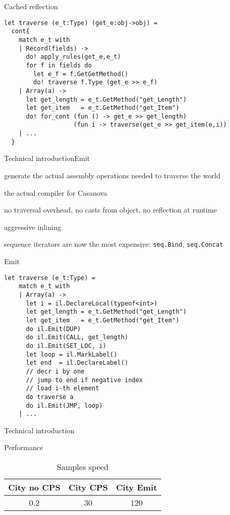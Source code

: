 \documentclass{beamer}
\begin{document}
\begin{frame}[fragile]{Cached reflection}
\begin{lstlisting}
let traverse (e_t:Type) (get_e:obj->obj) =
  cont{
    match e_t with
    | Record(fields) ->
      do! apply_rules(get_e,e_t)
      for f in fields do
        let e_f = f.GetGetMethod()
        do! traverse f.Type (get_e >> e_f)
    | Array(a) ->
      let get_length = e_t.GetMethod("get_Length")
      let get_item   = e_t.GetMethod("get_Item")
      do! for_cont (fun () -> get_e >> get_length)
                   (fun i -> traverse(get_e >> get_item(e,i))
    | ...
  }
\end{lstlisting}
\end{frame}

\begin{slide}{Technical introduction}{Emit}{
\item generate the actual assembly operations needed to traverse the world
\item the actual compiler for Casanova
\item no traversal overhead, no casts from object, no reflection at runtime
\item aggressive inlining
\item sequence iterators are now the most expensive: \texttt{seq.Bind}, \texttt{seq.Concat}
}\end{slide}


\begin{frame}[fragile]{Emit}
\begin{lstlisting}
let traverse (e_t:Type) =
    match e_t with
    | Array(a) ->
      let i = il.DeclareLocal(typeof<int>)
      let get_length = e_t.GetMethod("get_Length")
      let get_item   = e_t.GetMethod("get_Item")
      do il.Emit(DUP)
      do il.Emit(CALL, get_length)
      do il.Emit(SET_LOC, i)
      let loop = il.MarkLabel()
      let end  = il.DeclareLabel()
      // decr i by one
      // jump to end if negative index
      // load i-th element
      do traverse a
      do il.Emit(JMP, loop)
    | ...
\end{lstlisting}
\end{frame}

\begin{frame}{Technical introduction}
\begin{block}{Performance}
\begin{table}
\center
\begin{tabular}{| c | c | c |}
\hline
City no CPS & City CPS & City Emit \\
\hline
0.2 & 30 & 120 \\
\hline
\end{tabular}
\caption{Samples speed}
\end{table}
\end{block}
\end{frame}
\end{document}
